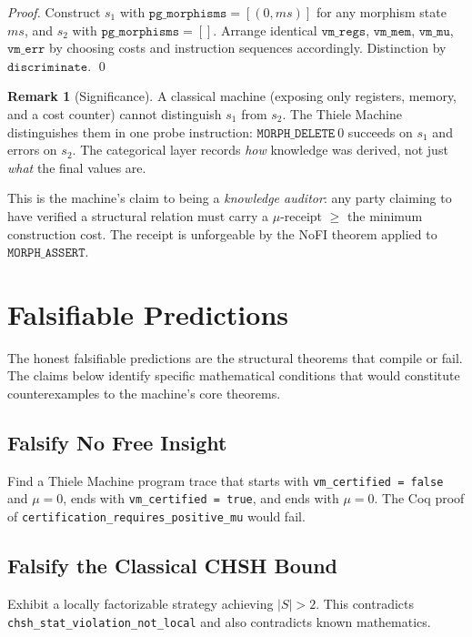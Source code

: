 \documentclass[11pt, a4paper]{report}
\theoremstyle{definition}
\newtheorem{remark}{Remark}[chapter]
\theoremstyle{plain}
\begin{document}
\begin{proof}
Construct $s_1$ with $\texttt{pg\_morphisms} = [(0, ms)]$ for any morphism state $ms$, and $s_2$ with $\texttt{pg\_morphisms} = []$. Arrange identical $\texttt{vm\_regs}$, $\texttt{vm\_mem}$, $\texttt{vm\_mu}$, $\texttt{vm\_err}$ by choosing costs and instruction sequences accordingly. Distinction by $\texttt{discriminate}$. \qed
\end{proof}

\begin{remark}[Significance]
A classical machine (exposing only registers, memory, and a cost counter) cannot distinguish $s_1$ from $s_2$. The Thiele Machine distinguishes them in one probe instruction: $\texttt{MORPH\_DELETE}\ 0$ succeeds on $s_1$ and errors on $s_2$. The categorical layer records \emph{how} knowledge was derived, not just \emph{what} the final values are.

This is the machine's claim to being a \emph{knowledge auditor}: any party claiming to have verified a structural relation must carry a $\mu$-receipt $\geq$ the minimum construction cost. The receipt is unforgeable by the NoFI theorem applied to $\texttt{MORPH\_ASSERT}$.
\end{remark}
\chapter{Falsifiable Predictions}

The honest falsifiable predictions are the structural theorems that compile or fail. The claims below identify specific mathematical conditions that would constitute counterexamples to the machine's core theorems.

\section{Falsify No Free Insight}

Find a Thiele Machine program trace that starts with \texttt{vm\_certified = false} and $\mu = 0$, ends with \texttt{vm\_certified = true}, and ends with $\mu = 0$. The Coq proof of \texttt{certification\_requires\_positive\_mu} would fail.

\section{Falsify the Classical CHSH Bound}

Exhibit a locally factorizable strategy achieving $|S| > 2$. This contradicts \texttt{chsh\_stat\_violation\_not\_local} and also contradicts known mathematics.
\end{document}
